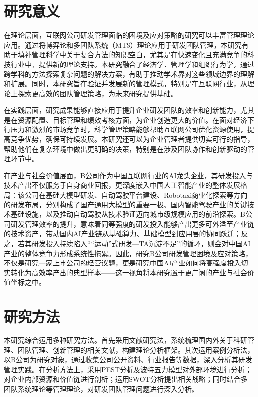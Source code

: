 \section{研究意义}

在理论层面，互联网公司研发管理面临的困境及应对策略的研究可以丰富管理理论应用。通过将博弈论和多团队系统（MTS）理论\cite{mathieu2008team}应用于研发团队管理，本研究有助于填补管理科学中关于复合方法的知识空白，尤其是在快速变化且充满竞争的科技行业中，提供新的理论支持\cite{damanpour2012managerial}。本研究融合了经济学、管理学和组织行为学，通过跨学科的方法探索复杂问题的解决方案，有助于推动学术界对这些领域边界的理解和扩展\cite{tian2009multidisciplinary}。同时，本研究旨在验证并发展新的管理模式，特别是在互联网行业，从理论上探索更高效的团队管理策略，为未来研究提供基础\cite{ouyang2005ceo,wei2012excellence}。

在实践层面，研究成果能够直接应用于提升企业研发团队的效率和创新能力\cite{zhou2020positive}，尤其是在资源配置、目标管理和绩效考核方面\cite{chen2006technology,gao2004technology}，为企业创造更大的价值。在面对经济下行压力和激烈的市场竞争时，科学管理策略能够帮助互联网公司优化资源使用，提高竞争优势，确保可持续发展\cite{du2024mixed,li2022configuration}。本研究还可以为企业管理者提供切实可行的指导，帮助他们在复杂环境中做出更明确的决策，特别是在涉及团队协作和创新驱动的管理环节中。

在产业与社会价值层面，B公司作为中国互联网行业的AI龙头企业，其研发投入与技术产出不仅服务于自身商业回报，更深度嵌入中国人工智能产业的整体发展格局：该公司在基础大模型研发、自动驾驶平台建设、Robotaxi商业化探索等方向的研发布局，分别构成了国产通用大模型的重要一极、国内智能驾驶产业的关键技术基础设施，以及推动自动驾驶从技术验证迈向城市级规模应用的前沿探索。B公司研发管理效率的提升，意味着同等强度的研发投入能够产出更多可外溢至产业链的技术资产，带动国内AI产业链从基础算力、基础模型到应用层的协同跃迁；反之，若其研发投入持续陷入““运动”式研发—TA沉淀不足”的循环，则会对中国AI产业的整体竞争力形成系统性拖累。因此，研究B公司研发管理困境及应对策略，不仅是研究一家上市公司的经营议题，更是研究中国AI产业如何将高强度投入切实转化为高效率产出的典型样本——这一视角将本研究置于更广阔的产业与社会价值坐标之中。

\section{研究方法}

本研究综合运用多种研究方法。首先采用文献研究法，系统梳理国内外关于科研管理、团队管理、创新管理的相关文献，构建理论分析框架。其次运用案例分析法，以B公司为研究对象，通过收集公司公开资料、行业报告等数据，深入分析其研发管理实践。在分析方法上，采用PEST分析及波特五力模型对外部环境进行分析；对企业内部资源和价值链进行剖析；运用SWOT分析提出相关战略；同时结合多团队系统理论等管理理论，对研发团队管理问题进行深入分析。

